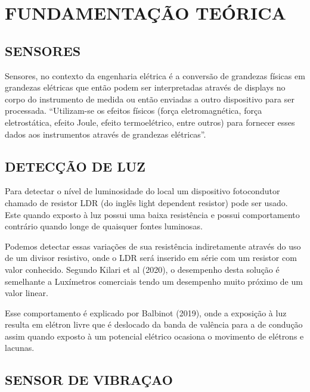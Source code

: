 
\chapter{FUNDAMENTAÇÃO TEÓRICA}
\label{chap:fundamentacaoTeorica}

\section{SENSORES}
\label{sec:sensores}

Sensores, no contexto da engenharia elétrica é a conversão de grandezas físicas em grandezas elétricas que então podem ser interpretadas através de displays no corpo do instrumento de medida ou então enviadas a outro dispositivo para ser processada. “Utilizam-se os efeitos físicos (força eletromagnética, força eletrostática, efeito Joule, efeito termoelétrico, entre outros) para fornecer esses dados aos instrumentos através de grandezas elétricas”. 

\section{DETECÇÃO DE LUZ}
\label{subsec:detecaoDeLuz}

Para detectar o nível de luminosidade do local um dispositivo fotocondutor chamado de resistor LDR (do inglês light dependent resistor) pode ser usado. Este quando exposto à luz possui uma baixa resistência e possui comportamento contrário quando longe de quaisquer fontes luminosas.

Podemos detectar essas variações de sua resistência indiretamente através do uso de um divisor resistivo, onde o LDR será inserido em série com um resistor com valor conhecido. Segundo Kilari et al (2020), o desempenho desta solução é semelhante a Luxímetros comerciais tendo um desempenho muito próximo de um valor linear.

Esse comportamento é explicado por Balbinot (2019), onde a exposição à luz resulta em elétron livre que é deslocado da banda de valência para a de condução assim quando exposto à um potencial elétrico ocasiona o movimento de elétrons e lacunas.

\section{SENSOR DE VIBRAÇAO}
\label{subsec:sensorDeVibracao}

